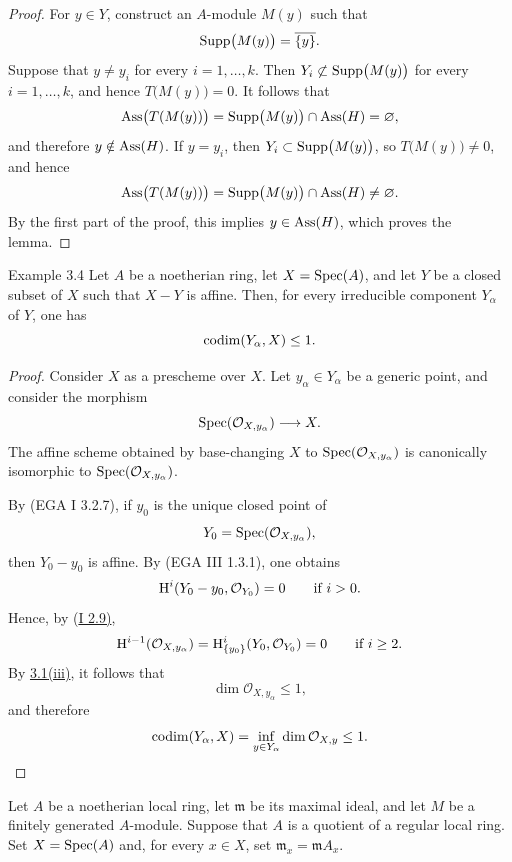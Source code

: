 \begin{proof}
For $y\in Y$, construct an $A$-module $M(y)$ such that
\[
  \operatorname{Supp}\bigl(M(y)\bigr)=\overline{\{y\}}.
\]
Suppose that $y\neq y_i$ for every $i=1,\ldots,k$. Then
$Y_i\not\subset\operatorname{Supp}\bigl(M(y)\bigr)$ for every $i=1,\ldots,k$, and hence
$T\bigl(M(y)\bigr)=0$. It follows that
\[
  \operatorname{Ass}\bigl(T(M(y))\bigr)
  =\operatorname{Supp}\bigl(M(y)\bigr)\cap\operatorname{Ass}(H)=\varnothing,
\]
and therefore $y\notin\operatorname{Ass}(H)$. If $y=y_i$, then
$Y_i\subset\operatorname{Supp}\bigl(M(y)\bigr)$, so $T\bigl(M(y)\bigr)\neq0$, and hence
\[
  \operatorname{Ass}\bigl(T(M(y))\bigr)
  =\operatorname{Supp}\bigl(M(y)\bigr)\cap\operatorname{Ass}(H)\neq\varnothing.
\]
By the first part of the proof, this implies $y\in\operatorname{Ass}(H)$, which proves
the lemma.\qedhere
\end{proof}

\begin{sgaexample}{Example 3.4}
Let $A$ be a noetherian ring, let $X=\operatorname{Spec}(A)$, and let $Y$ be a closed
subset of $X$ such that $X-Y$ is affine. Then, for every irreducible component
$Y_{\alpha}$ of $Y$, one has
\[
  \operatorname{codim}(Y_{\alpha},X)\leq 1.
\]
\end{sgaexample}

\begin{proof}
Consider $X$ as a prescheme over $X$. Let $y_{\alpha}\in Y_{\alpha}$ be a
generic point, and consider the morphism
\[
  \operatorname{Spec}(\mathcal O_{X,y_{\alpha}})\longrightarrow X.
\]
The affine scheme obtained by base-changing $X$ to
$\operatorname{Spec}(\mathcal O_{X,y_{\alpha}})$ is canonically isomorphic to
$\operatorname{Spec}(\mathcal O_{X,y_{\alpha}})$.

By \textup{(EGA I 3.2.7)}, if $y_0$ is the unique closed point of
\[
  Y_0=\operatorname{Spec}(\mathcal O_{X,y_{\alpha}}),
\]
then $Y_0-y_0$ is affine. By \textup{(EGA III 1.3.1)}, one obtains
\[
  \mathrm H^i(Y_0-y_0,\mathcal O_{Y_0})=0\qquad\text{if }i>0.
\]
Hence, by \textup{(\hyperref[I.2.9]{I 2.9)}},
\[
  \mathrm H^{i-1}(\mathcal O_{X,y_{\alpha}})
  =\mathrm H^i_{\{y_0\}}(Y_0,\mathcal O_{Y_0})=0
  \qquad\text{if }i\geq 2.
\]
By \hyperref[V.3.1]{3.1\textup{(iii)}}, it follows that
\[
  \dim\mathcal O_{X,y_{\alpha}}\leq 1,
\]
and therefore
\[
  \operatorname{codim}(Y_{\alpha},X)
  =\inf_{y\in Y_{\alpha}}\dim\mathcal O_{X,y}\leq 1.
\]
\end{proof}

Let $A$ be a noetherian local ring, let $\mathfrak m$ be its
maximal ideal, and let $M$ be a finitely generated $A$-module. Suppose that
$A$ is a quotient of a regular local ring. Set $X=\operatorname{Spec}(A)$ and, for every
$x\in X$, set $\mathfrak m_x=\mathfrak m A_x$.

